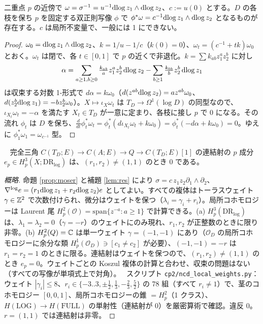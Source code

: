 \begin{prop}\tP\label{prop:moser}
二重点 $p$ の近傍で $\omega=\sigma^{-1}=u^{-1}\mathrm{dlog}\, z_1\wedge\mathrm{dlog}\, z_2$、$c:=u(0)$ とする。$D$ の各枝を保ち $p$ を固定する双正則写像 $\phi$ で $\phi^*\omega=c^{-1}\mathrm{dlog}\, z_1\wedge\mathrm{dlog}\, z_2$ となるものが存在する。$c$ は局所不変量で、一般には 1 にできない。
\end{prop}
\begin{proof}
$\omega_0=\mathrm{dlog}\, z_1\wedge\mathrm{dlog}\, z_2$、$k=1/u-1/c$（$k(0)=0$）、$\omega_t=(c^{-1}+tk)\omega_0$ とおく。$\omega_t$ は閉で、各 $t\in[0,1]$ で $p$ の近くで非退化。$k=\sum k_{ab}z_1^az_2^b$ に対し
\[\alpha=\sum_{a\ge1,b\ge0}\tfrac{k_{ab}}{a}z_1^az_2^b\,\mathrm{dlog}\, z_2-\sum_{b\ge1}\tfrac{k_{0b}}{b}z_2^b\,\mathrm{dlog}\, z_1\]
は収束する対数 1-形式で $d\alpha=k\omega_0$（$d(z^{ab}\mathrm{dlog}\, z_2)=az^{ab}\omega_0$、$d(z_2^b\mathrm{dlog}\, z_1)=-bz_2^b\omega_0$）。$X\mapsto\iota_X\omega_t$ は $T_D\to\Omega^1(\log D)$ の同型なので、$\iota_{X_t}\omega_t=-\alpha$ を満たす $X_t\in T_D$ が一意に定まり、各枝に接し $p$ で 0 になる。その流れ $\phi_t$ は $D$ を保ち、$\tfrac{d}{dt}\phi_t^*\omega_t=\phi_t^*(d\iota_{X_t}\omega_t+k\omega_0)=\phi_t^*(-d\alpha+k\omega_0)=0$。ゆえに $\phi_1^*\omega_1=\omega_{c^{-1}}$ 型。\qedhere
\end{proof}
\begin{lem}[連結射の消滅]\tP\ \tV\label{lem:conn}
完全三角 $C(T_D;E)\to C(A;E)\to Q\to C(T_D;E)[1]$ の連結射の $p$ 成分 $e_p\in H^3_p(X;\mathrm{DR}_{\log})$ は、$(r_1,r_2)\ne(1,1)$ のとき 0 である。
\end{lem}
\begin{proof}[概略]
命題 \ref{prop:moser} と補題 \ref{lem:res} により $\sigma=c\,z_1z_2\partial_1\wedge\partial_2$、$\nabla^{\log}e=(r_1\mathrm{dlog}\, z_1+r_2\mathrm{dlog}\, z_2)e$ としてよい。すべての複体はトーラスウェイト $\gamma\in\mathbb Z^2$ で次数付けられ、微分はウェイトを保つ（$\lambda_i=\gamma_i+r_i$）。局所コホモロジーは Laurent 尾 $H^2_p(\mathcal O)=\mathrm{span}\{z^{-a}:a\ge1\}$ で計算できる。(a) $H^3_p(\mathrm{DR}_{\log})$ は、$\lambda_1=\lambda_2=0$（$\gamma=-r$）のウェイトにのみ現れ、$r_1,r_2$ が正整数のときに限り非零。(b) $H^2_p(Q)=\mathbb C$ は単一ウェイト $\gamma=(-1,-1)$ にあり（$\mathcal O_D$ の局所コホモロジーに余分な類 $H^1_p(\mathcal O_D)\ni[c_1\ne c_2]$ が必要）、$(-1,-1)=-r$ は $r_1=r_2=1$ のときに限る。連結射はウェイトを保つので、$(r_1,r_2)\ne(1,1)$ のとき $e_p=0$。ウェイトごとの Koszul 複体の計算と合わせ、収束の問題はない（すべての写像が単項式上で対角）。
\tV\ スクリプト \texttt{cp2/ncd\_local\_weights.py}：ウェイト $|\gamma_i|\le8$、$r_i\in\{-3..3,\pm\frac12,\frac13,-\frac23,\frac52\}$ の 78 組（すべて $r_i\ne1$）で、茎のコホモロジー $[0,0,1]$、局所コホモロジーの錐 $=H^2_p$（1 クラス）、$H(\mathrm{LOG})\to H(\mathrm{FULL})$ の単射性（連結射が 0）を厳密算術で確認。違反 0。$r=(1,1)$ では連結射は非零。
\end{proof}
